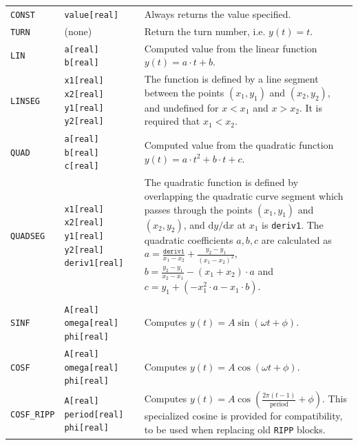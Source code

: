 \begin{center}
\begin{longtable}{|p{1.8cm} | p{4.1cm} | p{9.5cm}|}
    \rowcolor{blue!15}
    \multicolumn{3}{|l|}{Polynomial and elliptical functions} \\*
    \hline
    
    \texttt{CONST} & \texttt{value[real]} & 
    Always returns the value specified.\\*
    \hline
    
    \texttt{TURN} & (none) & 
    Return the turn number, i.e. $y(t) = t$.\\*
    \hline
    
    \texttt{LIN} & \texttt{a[real] b[real]} & 
    Computed value from the linear function $y(t) = a\cdot t + b$. \\*
    \hline
    
    \texttt{LINSEG} & \texttt{x1[real] x2[real] y1[real] y2[real]} & 
    The function is defined by a line segment between the points $(x_1,y_1)$ and $(x_2,y_2)$, and undefined for $x < x_1$ and $x>x_2$. 
    It is required that $x_1 < x_2$.\\*
    \hline
    
    \texttt{QUAD} & \texttt{a[real] b[real] c[real]} & 
    Computed value from the quadratic function $y(t) = a\cdot t^2 + b\cdot t + c$. \\*
    \hline
    
    \texttt{QUADSEG} & \texttt{x1[real] x2[real] y1[real] y2[real] deriv1[real]} & 
    The quadratic function is defined by overlapping the quadratic curve segment which passes through the points $(x_1,y_1)$ and $(x_2,y_2)$, and $\mathrm{d}y/\mathrm{d}x$ at $x_1$ is \texttt{deriv1}. 
    The quadratic coefficients $a,b,c$ are calculated as $a = \frac{\texttt{deriv1}}{x_1-x_2} + \frac{y_2-y_1}{(x_1-x_2)^2}$, $b=\frac{y_2-y_1}{x_2-x_1} - (x_1+x_2)\cdot a$ and $c = y_1 + \left(- x_1^2 \cdot a - x_1 \cdot b \right)$.\\
    \hline
    
    \rowcolor{blue!15}
    \multicolumn{3}{|l|}{Trancendental functions} \\*
    \hline
    
    \texttt{SINF} & \texttt{A[real] omega[real] phi[real]} & 
    Computes $y(t) = A\sin\left(\omega t + \phi\right)$.\\*
    \hline
    
    \texttt{COSF} & \texttt{A[real] omega[real] phi[real]} & 
    Computes $y(t) = A\cos\left(\omega t + \phi\right)$.\\*
    \hline
    
    \texttt{COSF\_RIPP} & \texttt{A[real] period[real] phi[real]} & 
    Computes $y(t) = A\cos\left(\frac{2\pi (t-1)}{\mathrm{period}} + \phi\right)$. 
    This specialized cosine is provided for compatibility, to be used when replacing old \texttt{RIPP} blocks.\\*
    \hline
    

\end{longtable}
\end{center}
